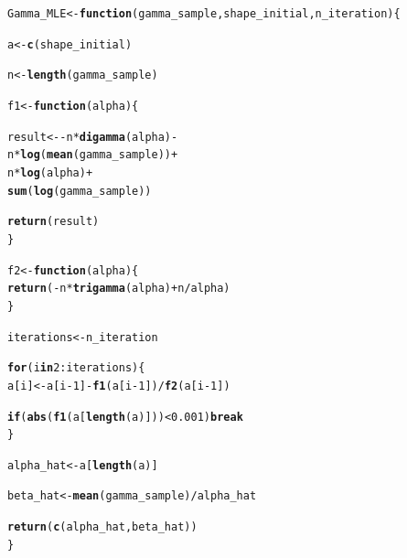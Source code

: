 \documentclass[11pt, a4paper]{article}\usepackage[]{graphicx}\usepackage[]{xcolor}
\makeatletter
\newcommand{\hlnum}[1]{\textcolor[rgb]{0.686,0.059,0.569}{#1}}%
\newcommand{\hlopt}[1]{\textcolor[rgb]{0,0,0}{#1}}%
\newcommand{\hldef}[1]{\textcolor[rgb]{0.345,0.345,0.345}{#1}}%
\newcommand{\hlkwa}[1]{\textcolor[rgb]{0.161,0.373,0.58}{\textbf{#1}}}%
\newcommand{\hlkwb}[1]{\textcolor[rgb]{0.69,0.353,0.396}{#1}}%
\newcommand{\hlkwc}[1]{\textcolor[rgb]{0.333,0.667,0.333}{#1}}%
\newcommand{\hlkwd}[1]{\textcolor[rgb]{0.737,0.353,0.396}{\textbf{#1}}}%
\newenvironment{kframe}{%
 \def\at@end@of@kframe{}%
 \ifinner\ifhmode%
  \def\at@end@of@kframe{\end{minipage}}%
  \begin{minipage}{\columnwidth}%
 \fi\fi%
 \def\FrameCommand##1{\hskip\@totalleftmargin \hskip-\fboxsep
 \colorbox{shadecolor}{##1}\hskip-\fboxsep
     \hskip-\linewidth \hskip-\@totalleftmargin \hskip\columnwidth}%
 \MakeFramed {\advance\hsize-\width
   \@totalleftmargin\z@ \linewidth\hsize
   \@setminipage}}%
 {\par\unskip\endMakeFramed%
 \at@end@of@kframe}
\newenvironment{knitrout}{}{} %
\makeatother
\begin{document}
\begin{knitrout}
\color{fgcolor}\begin{kframe}
\begin{alltt}
\hldef{Gamma_MLE} \hlkwb{<-} \hlkwa{function}\hldef{(}\hlkwc{gamma_sample}\hldef{,} \hlkwc{shape_initial}\hldef{,} \hlkwc{n_iteration}\hldef{)\{}

  \hldef{a} \hlkwb{<-} \hlkwd{c}\hldef{(shape_initial)}

  \hldef{n} \hlkwb{<-} \hlkwd{length}\hldef{(gamma_sample)}

  \hldef{f1} \hlkwb{<-} \hlkwa{function}\hldef{(}\hlkwc{alpha}\hldef{)\{}

    \hldef{result} \hlkwb{<-} \hlopt{-} \hldef{n} \hlopt{*} \hlkwd{digamma}\hldef{(alpha)} \hlopt{-}
      \hldef{n} \hlopt{*} \hlkwd{log}\hldef{(}\hlkwd{mean}\hldef{(gamma_sample))} \hlopt{+}
      \hldef{n} \hlopt{*} \hlkwd{log}\hldef{(alpha)} \hlopt{+}
      \hlkwd{sum}\hldef{(}\hlkwd{log}\hldef{(gamma_sample))}

    \hlkwd{return}\hldef{(result)}
  \hldef{\}}

  \hldef{f2} \hlkwb{<-} \hlkwa{function}\hldef{(}\hlkwc{alpha}\hldef{)\{}
    \hlkwd{return}\hldef{(}\hlopt{-}\hldef{n} \hlopt{*} \hlkwd{trigamma}\hldef{(alpha)} \hlopt{+} \hldef{n} \hlopt{/} \hldef{alpha)}
  \hldef{\}}

  \hldef{iterations} \hlkwb{<-} \hldef{n_iteration}

  \hlkwa{for} \hldef{(i} \hlkwa{in} \hlnum{2}\hlopt{:}\hldef{iterations) \{}
    \hldef{a[i]} \hlkwb{<-} \hldef{a[i}\hlopt{-}\hlnum{1}\hldef{]} \hlopt{-} \hlkwd{f1}\hldef{(a[i}\hlopt{-}\hlnum{1}\hldef{])} \hlopt{/} \hlkwd{f2}\hldef{(a[i}\hlopt{-}\hlnum{1}\hldef{])}

    \hlkwa{if}\hldef{(}\hlkwd{abs}\hldef{(}\hlkwd{f1}\hldef{(a[}\hlkwd{length}\hldef{(a)]))} \hlopt{<} \hlnum{0.001}\hldef{)} \hlkwa{break}
  \hldef{\}}

  \hldef{alpha_hat} \hlkwb{<-} \hldef{a[}\hlkwd{length}\hldef{(a)]}

  \hldef{beta_hat} \hlkwb{<-} \hlkwd{mean}\hldef{(gamma_sample)} \hlopt{/} \hldef{alpha_hat}

  \hlkwd{return}\hldef{(}\hlkwd{c}\hldef{(alpha_hat, beta_hat))}
\hldef{\}}
\end{alltt}
\end{kframe}
\end{knitrout}
\end{document}

